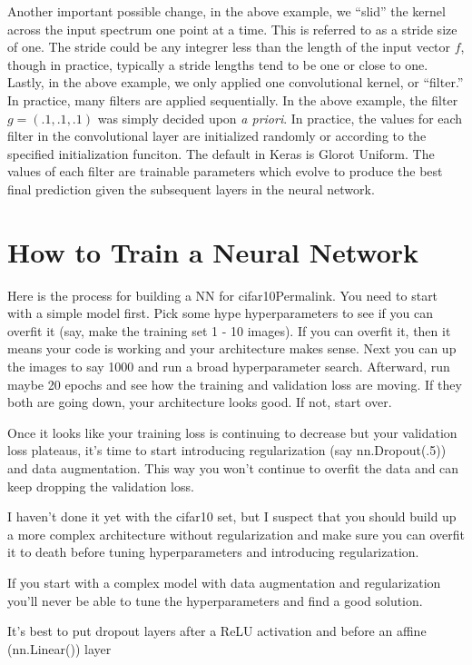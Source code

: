 Another important possible change, in the above example, we ``slid'' the kernel across the input spectrum one point at a time. This is referred to as a stride size of one. The stride could be any integrer less than the length of the input vector $ f $, though in practice, typically a stride lengths tend to be one or close to one. Lastly, in the above example, we only applied one convolutional kernel, or ``filter.'' In practice, many filters are applied sequentially. In the above example, the filter $ g = (.1, .1, .1) $ was simply decided upon \textit{a priori}. In practice, the values for each filter in the convolutional layer are initialized randomly or according to the specified initialization funciton. The default in Keras is Glorot Uniform. The values of each filter are trainable parameters which evolve to produce the best final prediction given the subsequent layers in the neural network.


\section{How to Train a Neural Network}
Here is the process for building a NN for cifar10Permalink.
You need to start with a simple model first. Pick some hype hyperparameters to see if you can overfit it (say, make the training set 1 - 10 images). If you can overfit it, then it means your code is working and your architecture makes sense. Next you can up the images to say 1000 and run a broad hyperparameter search. Afterward, run maybe 20 epochs and see how the training and validation loss are moving. If they both are going down, your architecture looks good. If not, start over.

Once it looks like your training loss is continuing to decrease but your validation loss plateaus, it’s time to start introducing regularization (say nn.Dropout(.5)) and data augmentation. This way you won’t continue to overfit the data and can keep dropping the validation loss.

I haven’t done it yet with the cifar10 set, but I suspect that you should build up a more complex architecture without regularization and make sure you can overfit it to death before tuning hyperparameters and introducing regularization.

If you start with a complex model with data augmentation and regularization you’ll never be able to tune the hyperparameters and find a good solution.

It’s best to put dropout layers after a ReLU activation and before an affine (nn.Linear()) layer


